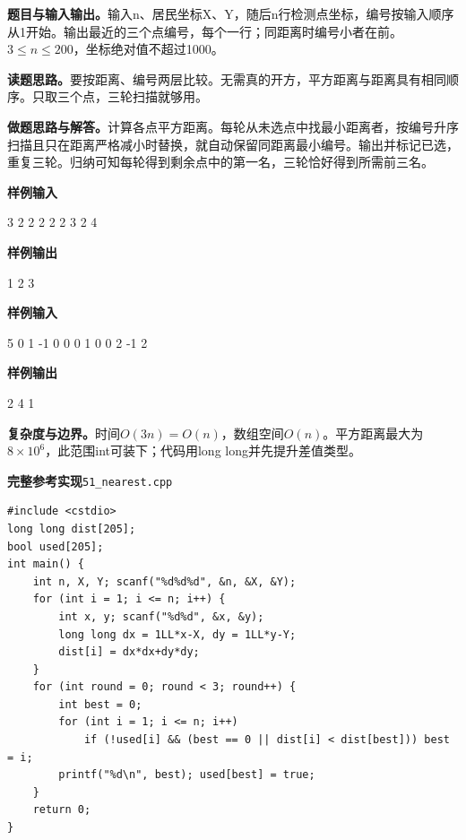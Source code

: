 \documentclass[UTF8,11pt,a4paper,fontset=none]{ctexart}
\begin{document}
\noindent\textbf{题目与输入输出。}输入n、居民坐标X、Y，随后n行检测点坐标，编号按输入顺序从1开始。输出最近的三个点编号，每个一行；同距离时编号小者在前。$3\le n\le200$，坐标绝对值不超过1000。

\noindent\textbf{读题思路。}要按距离、编号两层比较。无需真的开方，平方距离与距离具有相同顺序。只取三个点，三轮扫描就够用。

\noindent\textbf{做题思路与解答。}计算各点平方距离。每轮从未选点中找最小距离者，按编号升序扫描且只在距离严格减小时替换，就自动保留同距离最小编号。输出并标记已选，重复三轮。归纳可知每轮得到剩余点中的第一名，三轮恰好得到所需前三名。
\begin{tcolorbox}[samplebox,title={输入输出样例}]
\textbf{样例输入}
\begin{Sample}
3 2 2
2 2
2 3
2 4
\end{Sample}
\tcblower
\textbf{样例输出}
\begin{Sample}
1
2
3
\end{Sample}
\end{tcolorbox}
\begin{tcolorbox}[samplebox,title={输入输出样例}]
\textbf{样例输入}
\begin{Sample}
5 0 1
-1 0
0 0
1 0
0 2
-1 2
\end{Sample}
\tcblower
\textbf{样例输出}
\begin{Sample}
2
4
1
\end{Sample}
\end{tcolorbox}

\noindent\textbf{复杂度与边界。}时间$O(3n)=O(n)$，数组空间$O(n)$。平方距离最大为$8\times10^6$，此范围int可装下；代码用long long并先提升差值类型。
\par\noindent\begin{minipage}{\linewidth}
\textbf{完整参考实现}\quad\texttt{51\_nearest.cpp}
\begin{lstlisting}
#include <cstdio>
long long dist[205];
bool used[205];
int main() {
    int n, X, Y; scanf("%d%d%d", &n, &X, &Y);
    for (int i = 1; i <= n; i++) {
        int x, y; scanf("%d%d", &x, &y);
        long long dx = 1LL*x-X, dy = 1LL*y-Y;
        dist[i] = dx*dx+dy*dy;
    }
    for (int round = 0; round < 3; round++) {
        int best = 0;
        for (int i = 1; i <= n; i++)
            if (!used[i] && (best == 0 || dist[i] < dist[best])) best = i;
        printf("%d\n", best); used[best] = true;
    }
    return 0;
}
\end{lstlisting}
\end{minipage}\par
\end{document}
